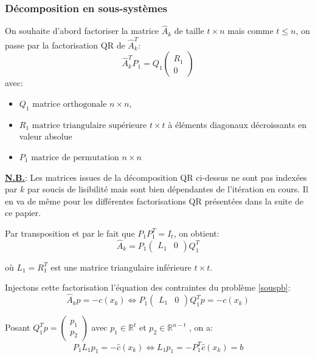 \documentclass[a4paper,11pt]{article}
\newcommand{\real}{\mathbb{R}}
\newcommand{\ha}{\hat{A}}
\newcommand{\hc}{\hat{c}}
\numberwithin{equation}{section}
\begin{document}
\subsubsection{Décomposition en sous-systèmes}

On souhaite d'abord factoriser la matrice $\ha_{k}$ de taille $t \times n$ mais comme $t \leq n$, on passe par la factorisation QR de $\ha_{k}^{T}$:
\begin{equation} \label{qrAt}
\ha_{k}^{T}P_{1}=Q_{1}
\begin{pmatrix}
R_{1} \\
0
\end{pmatrix}
\end{equation}
avec: \begin{itemize}
\item
$Q_{1}\text{ matrice orthogonale } n\times n$, 
\item
$ R_{1} \text{ matrice triangulaire supérieure } t \times t$ à éléments diagonaux décroissants en valeur absolue
\item
$P_{1} \text{ matrice de permutation } n\times n$
\end{itemize}

\textbf{\underline{N.B.}}: Les matrices issues de la décomposition QR ci-dessus ne sont pas indexées par $k$ par soucis de lisibilité mais sont bien dépendantes de l'itération en cours. Il en va de même pour les différentes factorisations QR présentées dans la suite de ce papier.

Par transposition et par le fait que $P_{1}P_{1}^{T} = I_{t}$, on obtient:
\begin{equation}
\ha_{k} = P_{1}
\begin{pmatrix}
L_{1} & 0
\end{pmatrix}
Q_{1}^{T}
\end{equation}

où $L_{1}=R_{1}^{T}$ est une matrice triangulaire inférieure $t \times t$.

Injectons cette factorisation l'équation des contraintes du problème \ref{souspb}: 
\[
\ha_{k}p = -c(x_{k}) \Longleftrightarrow P_{1}\begin{pmatrix}
L_{1} & 0
\end{pmatrix}
Q_{1}^{T}p = -c(x_{k})
\]

Posant $Q_{1}^{T}p = \begin{pmatrix}
p_{1} \\ p_{2}
\end{pmatrix}$ avec $p_{1} \in \real^{t}$ et $p_{2} \in \real^{n-t}$ , on a:
\[
P_{1}L_{1}p_{1} = -\hc(x_{k}) \Longleftrightarrow L_{1}p_{1} = -P_{1}^{T}\hc(x_{k}) = b
\]
\end{document}
